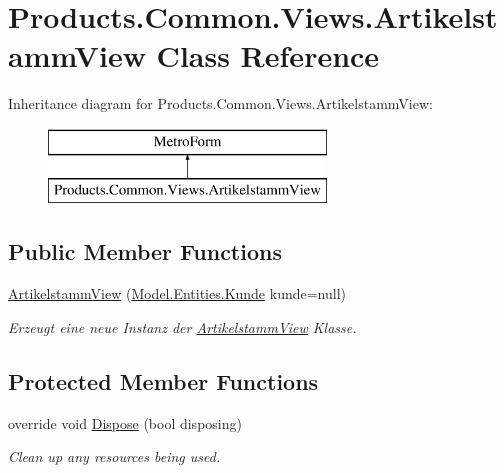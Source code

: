 \hypertarget{class_products_1_1_common_1_1_views_1_1_artikelstamm_view}{}\section{Products.\+Common.\+Views.\+Artikelstamm\+View Class Reference}
\label{class_products_1_1_common_1_1_views_1_1_artikelstamm_view}
Inheritance diagram for Products.\+Common.\+Views.\+Artikelstamm\+View\+:\begin{figure}[H]
\begin{center}
\leavevmode
\includegraphics[height=2.000000cm]{class_products_1_1_common_1_1_views_1_1_artikelstamm_view}
\end{center}
\end{figure}
\subsection*{Public Member Functions}
\begin{DoxyCompactItemize}
\item 
\hyperlink{class_products_1_1_common_1_1_views_1_1_artikelstamm_view_a528f2866a440b31ccce51f55c48d4e61}{Artikelstamm\+View} (\hyperlink{class_products_1_1_model_1_1_entities_1_1_kunde}{Model.\+Entities.\+Kunde} kunde=null)
\begin{DoxyCompactList}\small\item\em Erzeugt eine neue Instanz der \hyperlink{class_products_1_1_common_1_1_views_1_1_artikelstamm_view}{Artikelstamm\+View} Klasse. \end{DoxyCompactList}\end{DoxyCompactItemize}
\subsection*{Protected Member Functions}
\begin{DoxyCompactItemize}
\item 
override void \hyperlink{class_products_1_1_common_1_1_views_1_1_artikelstamm_view_aff344b912fdf64037ea56cc3bdf46a58}{Dispose} (bool disposing)
\begin{DoxyCompactList}\small\item\em Clean up any resources being used. \end{DoxyCompactList}\end{DoxyCompactItemize}


